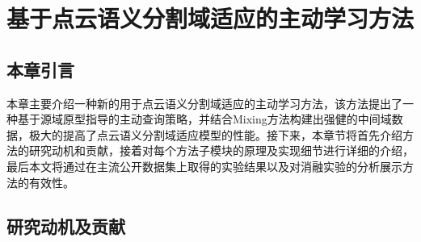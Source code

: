 

\chapter{基于点云语义分割域适应的主动学习方法}
\thispagestyle{others}
\pagestyle{others}
\xiaosi

\section{本章引言}
本章主要介绍一种新的用于点云语义分割域适应的主动学习方法，该方法提出了一种基于源域原型指导的主动查询策略，并结合Mixing方法构建出强健的中间域数据，极大的提高了点云语义分割域适应模型的性能。接下来，本章节将首先介绍方法的研究动机和贡献，接着对每个方法子模块的原理及实现细节进行详细的介绍，最后本文将通过在主流公开数据集上取得的实验结果以及对消融实验的分析展示方法的有效性。

\section{研究动机及贡献}


